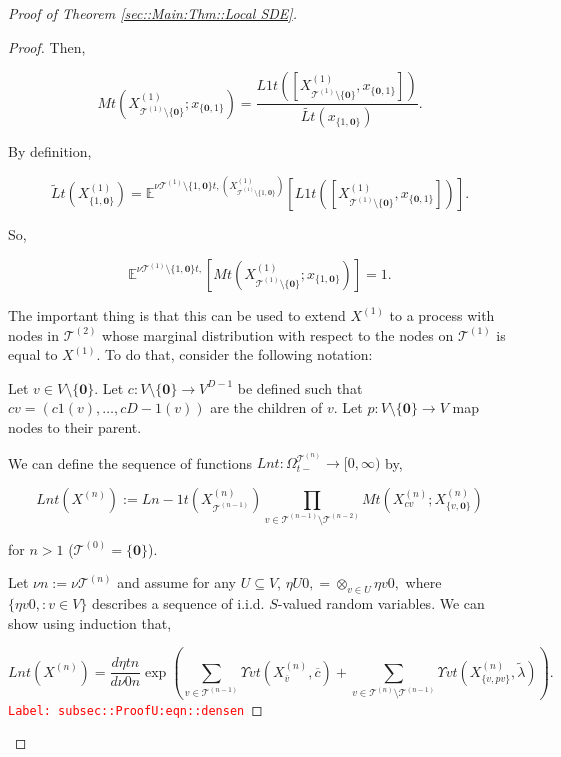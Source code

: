 \documentclass[12pt]{article}
\newcommand{\mb}{\mathbb}
\newcommand{\mc}{\mathcal}
\newcommand{\ra}{\rightarrow}
\newcommand{\ov}{\overline}
\newcommand{\tr}{\textcolor{red}}
\newcommand{\labe}[1]{\tr{\texttt{Label: #1}}}
\newcommand{\ind}{\hspace{24pt}}
\newcommand{\exmu}[2]{\mb{E}^{#1}\left[#2\right]}	%
\newcommand{\defeq}{:=}								%
\renewcommand{\root}{\mathbf{0}}				%
\renewcommand{\v}{v}							%
\renewcommand{\U}{U}							%
\renewcommand{\S}{S}							%
\newcommand{\x}{x}								%
\renewcommand{\t}{t}							%
\newcommand{\sset}{\Omega}						%
\newcommand{\X}{X}								%
\newcommand{\vsi}[1]{^{#1}}						%
\newcommand{\cind}[1]{_{#1}}					%
\newcommand{\cl}{\ov}							%
\newcommand{\tip}[1]{#1}						%
\newcommand{\ts}[1]{_{#1}}						%
\newcommand{\degr}{D}							%
\newcommand{\IGrg}{\ov{c}}						%
\newcommand{\tree}{\mc{T}}						%
\newcommand{\sln}[1]{^{(#1)}}						%
\newcommand{\alt}[1]{\widetilde{#1}}			%
\newcommand{\mm}{\nu}							%
\newcommand{\mmm}{\eta}							%
\newcommand{\crate}{\alt{\lambda}}				%
\newcommand{\dense}{L}							%
\newcommand{\cdense}{M}							%
\newcommand{\ds}{\Upsilon}						%
\renewcommand{\c}{c}							%
\newcommand{\p}{p}								%
\begin{document}
\begin{proof}[Proof of Theorem \ref{sec::Main:Thm::Local SDE}]
\begin{proof}
Then,

\[\cdense{}{\t}(\X\sln{1}\cind{\tree\sln{1}\setminus\{\root\}}\tip{};\x\cind{\{\root,1\}}\tip{}) = \frac{\dense{1}{\t}([\X\sln{1}\cind{\tree\sln{1}\setminus\{\root\}}\tip{},\x\cind{\{\root,1\}}\tip{}])}{\alt{\dense{}{\t}}(\x\cind{\{1,\root\}}\tip{})}.\]

By definition,

\[\alt{\dense}{}{\t}(\X\sln{1}\cind{\{1,\root\}}\tip{}) = \exmu{\mm{\tree\sln{1}\setminus\{1,\root\}}{\t,}{}(\X\sln{1}\cind{\tree\sln{1}\setminus\{1,\root\}}\tip{})}{\dense{1}{\t}([\X\sln{1}\cind{\tree\sln{1}\setminus\{\root\}}\tip{},\x\cind{\{\root,1\}}\tip{}])}.\]

So,

\[\exmu{\mm{\tree\sln{1}\setminus\{1,\root\}}{\t,}{}}{\cdense{}{\t}(\X\sln{1}\cind{\tree\sln{1}\setminus\{\root\}}\tip{};\x\cind{\{1,\root\}}\tip{})} = 1.\]

The important thing is that this can be used to extend \(\X\sln{1}\cind{}\tip{}\) to a process with nodes in \(\tree\sln{2}\) whose marginal distribution with respect to the nodes on \(\tree\sln{1}\) is equal to \(\X\sln{1}\cind{}\tip{}\). To do that, consider the following notation:

\ind Let \(\v \in V\setminus\{\root\}\). Let \(\c{}:V\setminus\{\root\} \ra V^{\degr-1}\) be defined such that \(\c{\v} = (\c{1}(\v),\dots,\c{\degr-1}(\v))\) are the children of \(\v\). Let \(\p{}:V\setminus\{\root\}\ra V\) map nodes to their parent.

\ind We can define the sequence of functions \(\dense{n}{\t}: \sset\vsi{\tree\sln{n}}\ts{\t-} \ra [0,\infty)\) by,

\[\dense{n}{\t}(\X\sln{n}\cind{}\tip{}) := \dense{n-1}{\t}(\X\sln{n}\cind{\tree\sln{n-1}}\tip{})\prod_{\v\in \tree\sln{n-1}\setminus\tree\sln{n-2}} \cdense{}{\t}(\X\sln{n}\cind{\c{\v}}\tip{};\X\sln{n}\cind{\{\v,\root\}}\tip{})\]

for \(n > 1\) (\(\tree\sln{0} = \{\root\}\)). 

\ind Let \(\mm{}{}{n}\defeq \mm{\tree\sln{n}}{}{}\) and assume for any \(\U \subseteq V\), \(\mmm{\U}{0,}{} = \otimes_{\v\in\U}\mmm{\v}{0,}{}\) where \(\{\mmm{\v}{0,}{}:\v\in V\}\) describes a sequence of i.i.d. \(\S\)-valued random variables. We can show using induction that,

\begin{equation}
\dense{n}{\t}(\X\sln{n}\cind{}\tip{}) = \frac{d\mmm{}{\t}{n}}{d\mm{}{0}{n}}\exp\left(\sum_{\v\in\tree\sln{n-1}}\ds{\v}{\t}(\X\sln{n}\cind{\cl{\v}}\tip{},\IGrg{}) + \sum_{\v\in\tree\sln{n}\setminus\tree\sln{n-1}} \ds{\v}{\t}(\X\sln{n}\cind{\{v,\p{\v}\}}\tip{},\crate{}{})\right).
\label{subsec::ProofU:eqn::densen}
\end{equation}
\labe{subsec::ProofU:eqn::densen}


\end{proof}
\end{proof}
\end{document}
